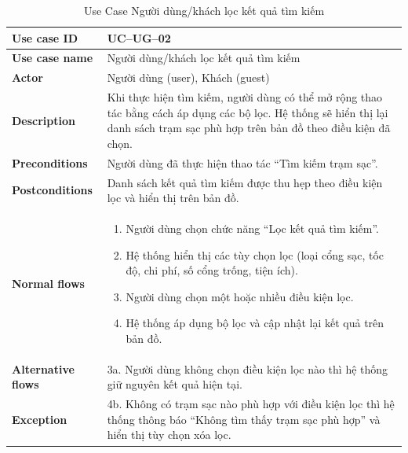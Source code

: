 \begin{itemize}
\begin{longtable}{|m{}|m{}|}
          \caption{Use Case Người dùng/khách lọc kết quả tìm kiếm} \\
  \hline
  \textbf{Use case ID} & UC--UG--02 \\
  \hline
  \textbf{Use case name} & Người dùng/khách lọc kết quả tìm kiếm \\
  \hline
  \textbf{Actor} & Người dùng (user), Khách (guest) \\
  \hline
  \textbf{Description} & Khi thực hiện tìm kiếm, người dùng có thể mở rộng thao tác bằng cách áp dụng các bộ lọc. Hệ thống sẽ hiển thị lại danh sách trạm sạc phù hợp trên bản đồ theo điều kiện đã chọn. \\
  \hline
  \textbf{Preconditions} & Người dùng đã thực hiện thao tác “Tìm kiếm trạm sạc”. \\
  \hline
  \textbf{Postconditions} & Danh sách kết quả tìm kiếm được thu hẹp theo điều kiện lọc và hiển thị trên bản đồ. \\
  \hline
  \textbf{Normal flows} &
  \begin{enumerate}[label=\arabic*.]
    \item Người dùng chọn chức năng “Lọc kết quả tìm kiếm”.
    \item Hệ thống hiển thị các tùy chọn lọc (loại cổng sạc, tốc độ, chi phí, số cổng trống, tiện ích).
    \item Người dùng chọn một hoặc nhiều điều kiện lọc.
    \item Hệ thống áp dụng bộ lọc và cập nhật lại kết quả trên bản đồ.
  \end{enumerate}\\
  \hline
  \textbf{Alternative flows} &
  3a. Người dùng không chọn điều kiện lọc nào thì hệ thống giữ nguyên kết quả hiện tại.\\
  \hline
  \textbf{Exception} &
  4b. Không có trạm sạc nào phù hợp với điều kiện lọc thì hệ thống thông báo “Không tìm thấy trạm sạc phù hợp” và hiển thị tùy chọn xóa lọc.\\
  \hline
  \end{longtable}


\end{itemize}
